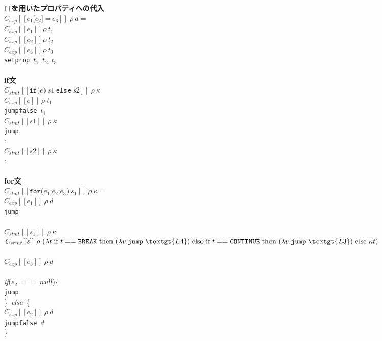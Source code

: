 \documentclass[a4j,12pt]{jarticle}
\begin{document}
{\begin{tabbing}
\textbf{\texttt{[]}を用いたプロパティへの代入} \\
\>$C_{exp}[[e_1\texttt{[}e_2\texttt{]}\ \texttt{=}\ e_3]]\ \rho\ d=$ \\
\>\>$C_{exp}[[e_1]] \rho\ t_1$ \\
\>\>$C_{exp}[[e_2]] \rho\ t_2$ \\
\>\>$C_{exp}[[e_3]] \rho\ t_3$ \\
\>\>\texttt{setprop}\ $t_1$\ $t_2$\ $t_3$ \\
\\

\textbf{if文} \\
\>$C_{stmt}[[\texttt{if(}e\texttt{)}\ s1\ \texttt{else}\ s2]]\ \rho\ \kappa$ \\
\>\>$C_{exp}[[e]]\ \rho\ t_1$ \\
\>\>\texttt{jumpfalse}\ $t_1$\  \\
\>\>$C_{stmt}[[s1]]\ \rho\ \kappa$ \\
\>\>\texttt{jump}\  \\
\>\>: \\
\>\>$C_{stmt}[[s2]]\ \rho\ \kappa$ \\
\>\>: \\
\\

\textbf{for文} \\
\>$C_{stmt}[[\texttt{for(}e_1\texttt{;}e_2\texttt{;}e_3\texttt{)}\ s_1]]\ \rho\ \kappa =$\\
\>\>$C_{exp}[[e_1]]\ \rho\ d$ \\
\>\>\texttt{jump}\  \\
\>\> \\
\>\>$C_{stmt}[[s_1]]\ \rho\ \kappa$ \\
\>\>$C_{stmt}[[s]]\ \rho\ (\lambda t . \textrm{if}\ t == \texttt{BREAK}\ 
\textrm{then}\ (\lambda v . \texttt{jump}\ \textgt{L4})\ \textrm{else}\ 
\textrm{if}\ t == \texttt{CONTINUE}\ 
\textrm{then}\ (\lambda v . \texttt{jump}\ \textgt{L3})\ \textrm{else}\ 
\kappa t)$ \\
\>\>\textgt{L3:} \\
\>\>$C_{exp}[[e_3]]\ \rho\ d$ \\
\>\>\textgt{L1:}  \\
\>\>\textit{if}($e_2\ ==\ null$)\{ \\
\>\>\>\texttt{jump}\  \\
\>\>\}\ \textit{else}\ \{ \\
\>\>\>$C_{exp}[[e_2]]\ \rho\ d$ \\
\>\>\>\texttt{jumpfalse}\ $d$\  \\
\>\>\} \\
\>\>\textgt{L4:} \\
\\


\end{tabbing}}
\end{document}
